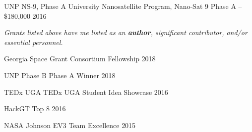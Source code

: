 \documentclass[10pt,a4paper]{article}
\begin{document}
\headedsection
  {{UNP NS-9, Phase A}}
  {%
  \headedsubsection
    {University Nanosatellite Program, Nano-Sat 9 Phase A -- \$180,000}
    {2016}
    {
    }
}

\begin{center}
  \emph{\small Grants listed above have me listed as an \textbf{author}, significant contributor, and/or essential personnel.}
\end{center}

\spacedhrule{0.5em}{-0.4em}

\vspace{-0.2em}

\headedsection
  {{Georgia Space Grant Consortium}}
  {%
  \headedsubsection
    {Fellowship}
    {2018}
    {
    }
}

\headedsection
  {{UNP Phase B}}
  {%
  \headedsubsection
    {Phase A Winner}
    {2018}
    {
    }
}

\headedsection
  {{TEDx UGA}}
  {%
  \headedsubsection
    {TEDx UGA Student Idea Showcase}
    {2016}
    {
    }
}

\headedsection
  {{HackGT}}
  {%
  \headedsubsection
    {Top 8}
    {2016}
    {
    }
}

\headedsection
  {{NASA Johnson EV3}}
  {%
  \headedsubsection
    {Team Excellence}
    {2015}
    {
    }
}
\end{document}
